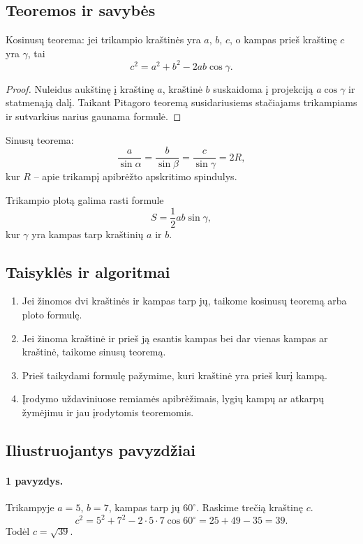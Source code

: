 \subsection{Teoremos ir savybės}

\begin{teorema}
Kosinusų teorema: jei trikampio kraštinės yra $a$, $b$, $c$, o kampas prieš kraštinę $c$ yra $\gamma$, tai
\[
c^2=a^2+b^2-2ab\cos\gamma.
\]
\end{teorema}
\begin{proof}
Nuleidus aukštinę į kraštinę $a$, kraštinė $b$ suskaidoma į projekciją $a\cos\gamma$ ir statmenąją dalį. Taikant Pitagoro teoremą susidariusiems stačiajams trikampiams ir sutvarkius narius gaunama formulė.
\end{proof}

\begin{teorema}
Sinusų teorema:
\[
\frac{a}{\sin\alpha}=\frac{b}{\sin\beta}=\frac{c}{\sin\gamma}=2R,
\]
kur $R$ -- apie trikampį apibrėžto apskritimo spindulys.
\end{teorema}

\begin{savybe}
Trikampio plotą galima rasti formule
\[
S=\frac12 ab\sin\gamma,
\]
kur $\gamma$ yra kampas tarp kraštinių $a$ ir $b$.
\end{savybe}

\subsection{Taisyklės ir algoritmai}

\begin{enumerate}
\item Jei žinomos dvi kraštinės ir kampas tarp jų, taikome kosinusų teoremą arba ploto formulę.
\item Jei žinoma kraštinė ir prieš ją esantis kampas bei dar vienas kampas ar kraštinė, taikome sinusų teoremą.
\item Prieš taikydami formulę pažymime, kuri kraštinė yra prieš kurį kampą.
\item Įrodymo uždaviniuose remiamės apibrėžimais, lygių kampų ar atkarpų žymėjimu ir jau įrodytomis teoremomis.
\end{enumerate}

\subsection{Iliustruojantys pavyzdžiai}

\paragraph{1 pavyzdys.}
Trikampyje $a=5$, $b=7$, kampas tarp jų $60^\circ$. Raskime trečią kraštinę $c$.
\[
c^2=5^2+7^2-2\cdot5\cdot7\cos60^\circ=25+49-35=39.
\]
Todėl $c=\sqrt{39}$.

